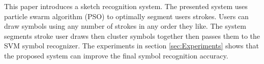 \documentclass{article}%
\begin{document}
This paper introduces a sketch recognition system. The presented system uses particle swarm algorithm (PSO) to optimally segment users strokes. Users can draw symbols using any number of strokes in any order they like. The system segments stroke user draws then cluster symbols together then passes them to the SVM symbol recognizer. The experiments in section \ref{sec:Experiments} shows that the proposed system can improve the final symbol recognition accuracy. 
\end{document}
